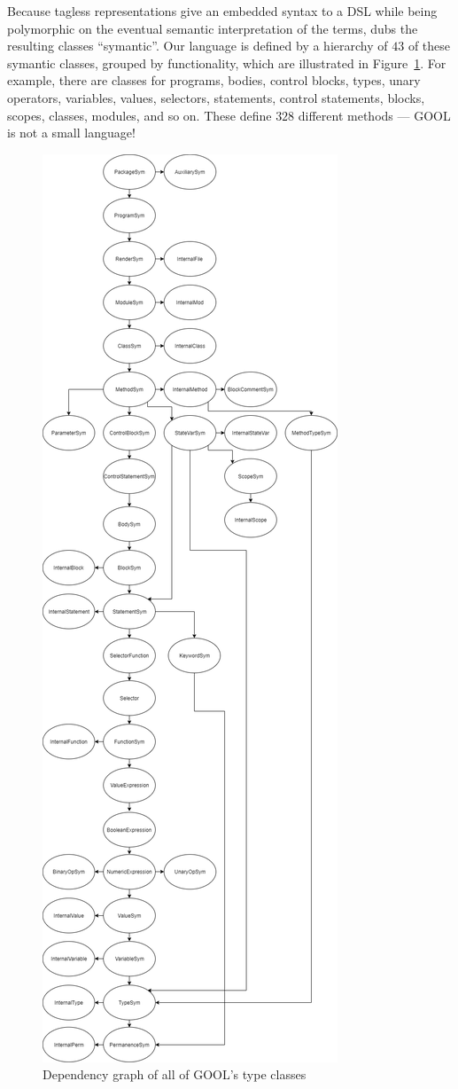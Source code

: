 \documentclass[sigplan,review,anonymous,prologue,dvipsnames]{acmart}
\begin{document}
Because tagless representations give an embedded syntax to a DSL while
being polymorphic on the eventual semantic interpretation of the terms,
\cite{carette2009finally} dubs the resulting classes ``symantic''.
Our language is defined by a hierarchy of $43$ of these symantic classes,
grouped by functionality, which are illustrated in Figure~\ref{fig:classes}.  
For example, there are classes for programs,
bodies, control blocks, types, unary operators, variables, values, selectors,
statements, control statements, blocks, scopes, classes, modules, and so
on.  These define $328$ different methods --- GOOL is not a small language!

\begin{figure}[!h]
	\includegraphics[scale=0.289]{GOOLClasses.png}
	\caption{Dependency graph of all of GOOL's type classes}
	\label{fig:classes}
\end{figure}
\end{document}
